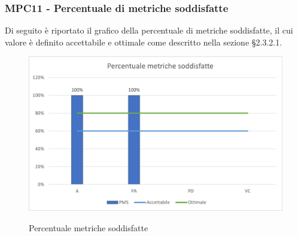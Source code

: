 \subsubsection{MPC11 - Percentuale di metriche soddisfatte}
Di seguito è riportato il grafico della percentuale di metriche soddisfatte, il cui valore è definito accettabile e ottimale come descritto nella sezione §2.3.2.1.\\

\begin{figure}[H]
\centering
\includegraphics[scale=0.78]{res/ResocontoAttivitaDiVerifica/res/metriche/grafici/img/metricheSoddisfatte.png}\\
\caption{Percentuale metriche soddisfatte}
\end{figure}

